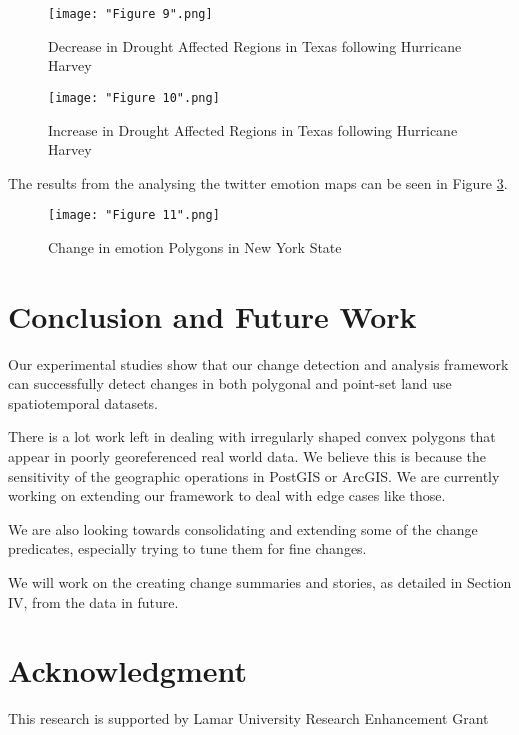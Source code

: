 \documentclass[conference]{IEEEtran}
\begin{document}
\begin{figure}[ht]
\centerline{\texttt{[image: "Figure 9".png]}}
\caption{Decrease in Drought Affected Regions in Texas following Hurricane Harvey}
\label{Figure 9}
\end{figure}

\begin{figure}[ht]
\centerline{\texttt{[image: "Figure 10".png]}}
\caption{Increase in Drought Affected Regions in Texas following Hurricane Harvey}
\label{Figure 10}
\end{figure}

The results from the analysing the twitter emotion maps can be seen in Figure \ref{Figure 11}.

\begin{figure}[ht]
\centerline{\texttt{[image: "Figure 11".png]}}
\caption{Change in emotion Polygons in New York State}
\label{Figure 11}
\end{figure}

\section{Conclusion and Future Work}

Our experimental studies show that our change detection and analysis framework can successfully detect changes in both polygonal and point-set land use spatiotemporal datasets. 
 
There is a lot work left in dealing with irregularly shaped convex polygons that appear in poorly georeferenced real world data. We believe this is because the sensitivity of the geographic operations in PostGIS or ArcGIS. We are currently working on extending our framework to deal with edge cases like those.

We are also looking towards consolidating and extending some of the change predicates, especially trying to tune them for fine changes.

We will work on the creating change summaries and stories, as detailed in Section IV,  from the data in future.

\section*{Acknowledgment}

This research is supported by Lamar University Research Enhancement Grant
\end{document}
